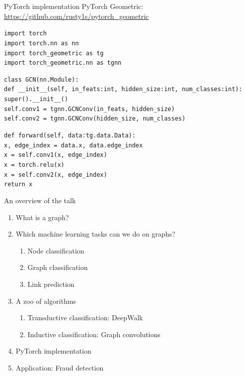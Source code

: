 \documentclass{beamer}
\begin{document}
\begin{frame}{PyTorch implementation}
  PyTorch Geometric:
  {\footnotesize\url{https://github.com/rusty1s/pytorch_geometric}}

  \pause\scriptsize
  \tt{import torch}\\
  \tt{import torch.nn as nn}\\
  \alert<3>{\tt{import torch\_geometric as tg}}\\
  \alert<3>{\tt{import torch\_geometric.nn as tgnn}}

  \tt{class GCN(nn.Module):}\\
  \qquad\tt{def \_\_init\_\_(self, in\_feats:int, hidden\_size:int,
  num\_classes:int):}\\
  \qquad\qquad\tt{super().\_\_init\_\_()}\\
  \qquad\qquad\tt{self.conv1 = 
  \alert<3>{tgnn.GCNConv(in\_feats, hidden\_size)}}\\
  \qquad\qquad\tt{self.conv2 = 
  \alert<3>{tgnn.GCNConv(hidden\_size, num\_classes)}}

  \qquad\tt{def forward(self, \alert<4>{data:tg.data.Data}):}\\
  \qquad\qquad\tt{\alert<4>{x, edge\_index = data.x, data.edge\_index}}\\
  \qquad\qquad\tt{x = self.conv1(x, \alert<4>{edge\_index})}\\
  \qquad\qquad\tt{x = torch.relu(x)}\\
  \qquad\qquad\tt{x = self.conv2(x, \alert<4>{edge\_index})}\\
  \qquad\qquad\tt{return x}
\end{frame}



\begin{frame}{An overview of the talk}
  \begin{enumerate}
    \item What is a graph?
    \item Which machine learning tasks can we do on graphs?
      \begin{enumerate}
        \item Node classification
        \item Graph classification
        \item Link prediction
      \end{enumerate}
    \item A zoo of algorithms
      \begin{enumerate}
        \item Transductive classification: DeepWalk
        \item Inductive classification: Graph convolutions
      \end{enumerate}
    \item PyTorch implementation
    \item<alert@1> Application: Fraud detection
  \end{enumerate}
\end{frame}
\end{document}
